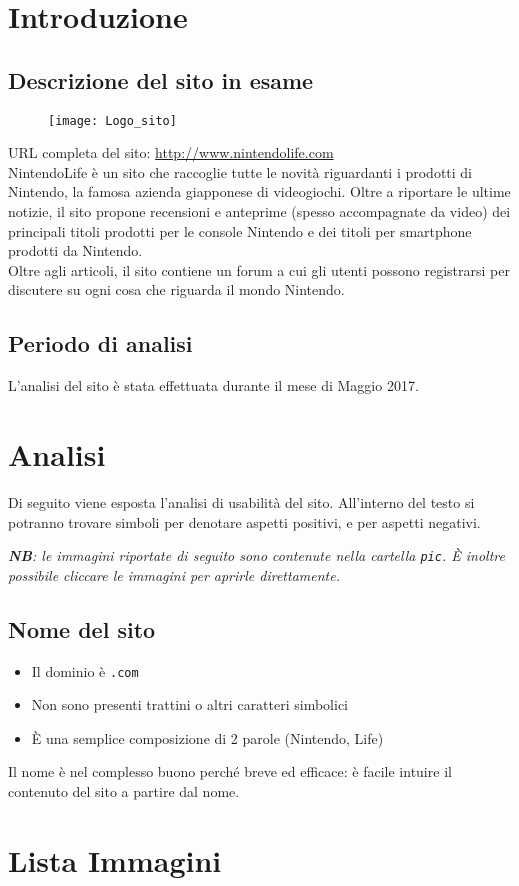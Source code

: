 \documentclass[12pt, a4paper,titlepage]{article}
\newcommand{\cmark}{\ding{51}}%
\newcommand{\xmark}{\ding{55}}%
\newcommand\FigList{}
\newcommand\AddFigToList[1]{\edef\FigList{\FigList#1,}}
\renewcommand{\includegraphics}[2][]{%
    \AddFigToList{#2}%
    \OldIncludegraphics[#1]{#2}%
}
\begin{document}
\section{Introduzione}
\label{sec:introduzione}
\subsection{Descrizione del sito in esame}
\begin{figure}[h]
\centering
\texttt{[image: Logo\_sito]}
\end{figure}
URL completa del sito: \url{http://www.nintendolife.com}\\
NintendoLife è un sito che raccoglie tutte le novità riguardanti i prodotti di Nintendo, la famosa azienda giapponese di videogiochi. Oltre a riportare le ultime notizie, il sito propone recensioni e anteprime (spesso accompagnate da video) dei principali titoli prodotti per le console Nintendo e dei titoli per smartphone prodotti da Nintendo.\\
Oltre agli articoli, il sito contiene un forum a cui gli utenti possono registrarsi per discutere su ogni cosa che riguarda il mondo Nintendo.
\subsection{Periodo di analisi}
L'analisi del sito è stata effettuata durante il mese di Maggio 2017.

\section{Analisi} %
\label{sec:analisi}
Di seguito viene esposta l'analisi di usabilità del sito. All'interno del testo si potranno trovare simboli \cmark per denotare aspetti positivi, e \xmark per aspetti negativi.

\emph{\textbf{NB}: le immagini riportate di seguito sono contenute nella cartella \texttt{pic}. È inoltre possibile cliccare le immagini per aprirle direttamente.}
\subsection{Nome del sito}
\label{sec:nome-sito}
\begin{itemize}
    \item[\cmark] Il dominio è \texttt{.com}
    \item[\cmark] Non sono presenti trattini o altri caratteri simbolici
    \item[\cmark] È una semplice composizione di 2 parole (Nintendo, Life)
\end{itemize}
Il nome è nel complesso buono perché breve ed efficace: è facile intuire il contenuto del sito a partire dal nome.
\clearpage


\clearpage


\section{Lista Immagini}
\label{sec:immagini}
\end{document}
